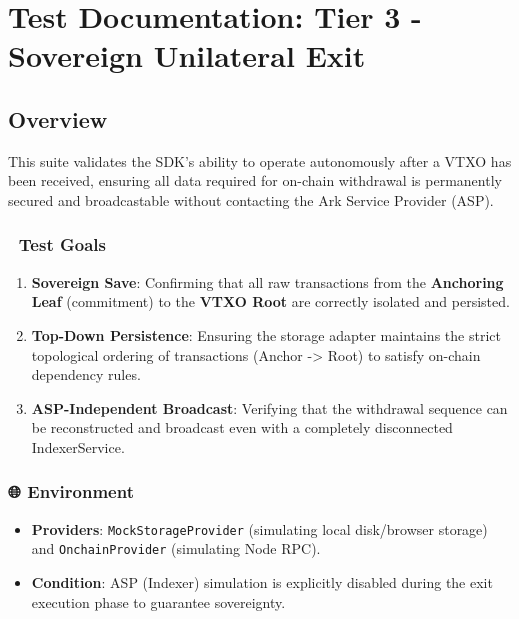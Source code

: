 \documentclass[
]{article}
\author{}
\date{}
\providecommand{\tightlist}{%
  \setlength{\itemsep}{0pt}\setlength{\parskip}{0pt}}
\begin{document}
\hypertarget{test-documentation-tier-3---sovereign-unilateral-exit}{%
\section{Test Documentation: Tier 3 - Sovereign Unilateral
Exit}\label{test-documentation-tier-3---sovereign-unilateral-exit}}

\hypertarget{overview}{%
\subsection{Overview}\label{overview}}

This suite validates the SDK's ability to operate autonomously after a
VTXO has been received, ensuring all data required for on-chain
withdrawal is permanently secured and broadcastable without contacting
the Ark Service Provider (ASP).

\hypertarget{test-goals}{%
\subsubsection{🎯 Test Goals}\label{test-goals}}

\begin{enumerate}
\def\labelenumi{\arabic{enumi}.}
\tightlist
\item
  \textbf{Sovereign Save}: Confirming that all raw transactions from the
  \textbf{Anchoring Leaf} (commitment) to the \textbf{VTXO Root} are
  correctly isolated and persisted.
\item
  \textbf{Top-Down Persistence}: Ensuring the storage adapter maintains
  the strict topological ordering of transactions (Anchor
  -\textgreater{} Root) to satisfy on-chain dependency rules.
\item
  \textbf{ASP-Independent Broadcast}: Verifying that the withdrawal
  sequence can be reconstructed and broadcast even with a completely
  disconnected IndexerService.
\end{enumerate}

\hypertarget{environment}{%
\subsubsection{🌐 Environment}\label{environment}}

\begin{itemize}
\tightlist
\item
  \textbf{Providers}: \texttt{MockStorageProvider} (simulating local
  disk/browser storage) and \texttt{OnchainProvider} (simulating Node
  RPC).
\item
  \textbf{Condition}: ASP (Indexer) simulation is explicitly disabled
  during the exit execution phase to guarantee sovereignty.
\end{itemize}
\end{document}
